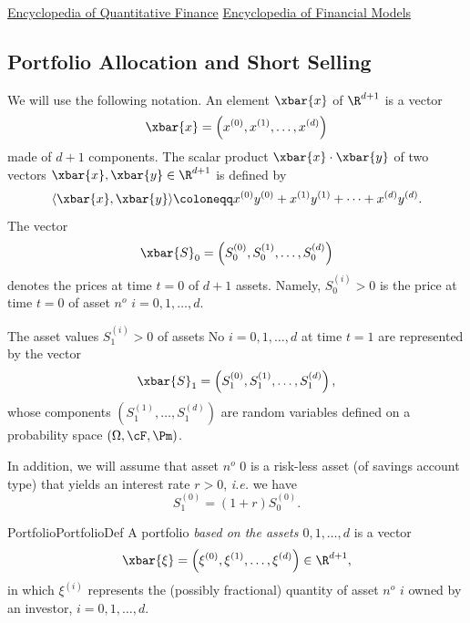 \href{https://onlinelibrary.wiley.com/doi/book/10.1002/9780470061602}{Encyclopedia of Quantitative Finance}
\href{https://onlinelibrary.wiley.com/doi/book/10.1002/9781118182635}{Encyclopedia of Financial Models}


\subsection{Portfolio Allocation and Short Selling}

\noindent We will use the following notation. An element \(\xbar{x}\) of \(\R^{d+1}\) is a vector
\begin{equation} \label{eq:VectorDefinition}
    \xbar{x} = \left(x^{(0)}, x^{(1)}, \dots, x^{(d)}\right)
\end{equation}
made of \(d+1\) components. The scalar product \(\xbar{x} \cdot \xbar{y}\) of two vectors \(\xbar{x}, \xbar{y} \in \R^{d+1}\) is defined by
\begin{equation} \label{eq:ScalarProductDefinition}
    \langle\xbar{x}, \xbar{y}\rangle \coloneqq x^{(0)}y^{(0)} + x^{(1)}y^{(1)} + \dots + x^{(d)}y^{(d)}.
\end{equation}
The vector
\begin{equation} \label{eq:PriceVectorT0}
    \xbar{S}_0 = \left(S_0^{(0)}, S_0^{(1)}, \dots, S_0^{(d)}\right)
\end{equation}
denotes the prices at time \(t=0\) of \(d+1\) assets. Namely, \(S_0^{(i)} > 0\) is the price at time \(t=0\) of asset \(n^o\) \(i=0, 1, \dots, d\).

The asset values \(S_1^{(i)} > 0\) of assets No \(i=0, 1, \dots, d\) at time \(t=1\) are represented by the vector
\begin{equation} \label{eq:PriceVectorT1}
    \xbar{S}_1 = \left(S_1^{(0)}, S_1^{(1)}, \dots, S_1^{(d)}\right),
\end{equation}
whose components \(\left(S_1^{(1)}, \dots, S_1^{(d)}\right)\) are random variables defined on a probability space \((\Omega, \cF, \Pm)\).

In addition, we will assume that asset \(n^o\) 0 is a risk-less asset (of savings account type) that yields an interest rate \(r > 0\), \textit{i.e.} we have
\begin{equation} \label{eq:RisklessAssetDynamics}
    S_1^{(0)} = (1+r)S_0^{(0)}.
\end{equation}

\begin{defn}{Portfolio}{PortfolioDef}
    A portfolio \textit{based on the assets \(0,1,\dots,d\)} is a vector
    \begin{equation} \label{eq:PortfolioVector}
        \xbar{\xi} = \left(\xi^{(0)}, \xi^{(1)}, \dots, \xi^{(d)}\right) \in \R^{d+1},
    \end{equation}
    in which \(\xi^{(i)}\) represents the (possibly fractional) quantity of asset \(n^o\) \(i\) owned by an investor, \(i=0, 1, \dots, d\).
\end{defn}

